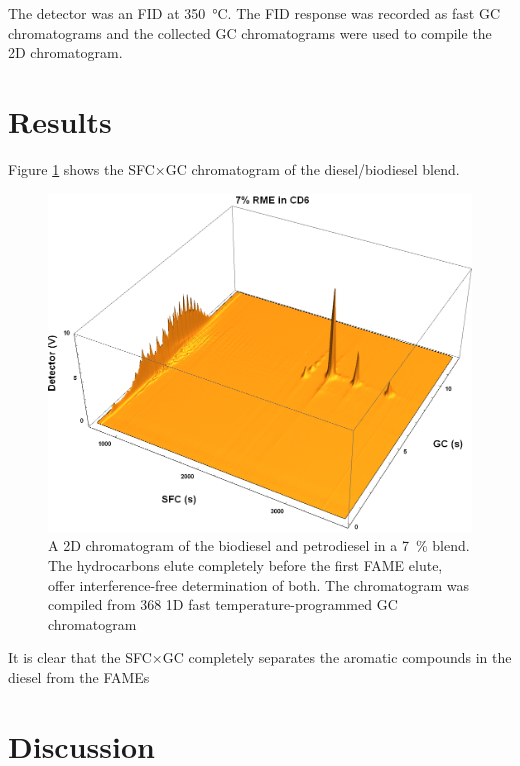 The detector was an FID at \SI{350}{\celsius}. The FID response was recorded as
fast GC chromatograms and the collected GC chromatograms were used to compile
the 2D chromatogram.

\section{Results}

Figure \ref{fig:PAH_FAMEs} shows the SFC×GC chromatogram of the diesel/biodiesel blend.

\begin{figure}
	\centering
	\includegraphics[width=\textwidth]{Figures/PAH_FAMEs.png}
	\decoRule	
	
\caption[Biodiesel separated from petrodiesel.]{A 2D chromatogram of the
biodiesel and petrodiesel in a \SI{7}{\percent} blend. The hydrocarbons elute
completely before the first FAME elute, offer interference-free determination of
both. The chromatogram was compiled from \num{368} 1D fast temperature-programmed GC
chromatogram}

	\label{fig:PAH_FAMEs} 
\end{figure}

It is clear that the SFC×GC completely separates the aromatic compounds in the diesel from the FAMEs 





\section{Discussion}

